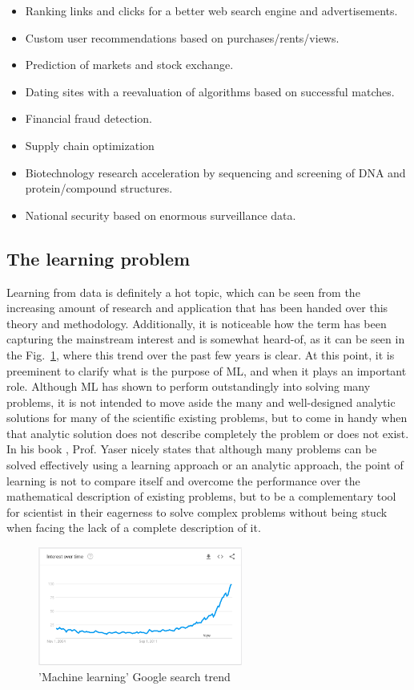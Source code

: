 \begin{itemize}
    \item Ranking links and clicks for a better web search engine and advertisements.
    \item Custom user recommendations based on purchases/rents/views.
    \item Prediction of markets and stock exchange.
    \item Dating sites with a reevaluation of algorithms based on successful matches.
    \item Financial fraud detection.
    \item Supply chain optimization
    \item Biotechnology research acceleration by sequencing and screening of DNA and protein/compound structures.
    \item National security based on enormous surveillance data.
\end{itemize}

\subsection{The learning problem}
Learning from data is definitely a hot topic, which can be seen from the increasing amount of research and application that has been handed over this theory and methodology. Additionally, it is noticeable how the term has been capturing the mainstream interest and is somewhat heard-of, as it can be seen in the Fig.~\ref{fig:ml_trend}, where this trend over the past few years is clear. At this point, it is preeminent to clarify what is the purpose of \ac{ML}, and when it plays an important role. Although \ac{ML} has shown to perform outstandingly into solving many problems, it is not intended to move aside the many and well-designed analytic solutions for many of the scientific existing problems, but to come in handy when that analytic solution does not describe completely the problem or does not exist. In his book \cite{Yaser}, Prof. Yaser nicely states that although many problems can be solved effectively using a learning approach or an analytic approach, the point of learning is not to compare itself and overcome the performance over the mathematical description of existing problems, but to be a complementary tool for scientist in their eagerness to solve complex problems without being stuck when facing the lack of a complete description of it.

\begin{figure}[htb]
    \centering
      \includegraphics[width=0.6\textwidth]{figures/ml_trend.png}
      \caption{'Machine learning' Google search trend \cite{GoogleInc.2017}}
      \label{fig:ml_trend}
\end{figure}

